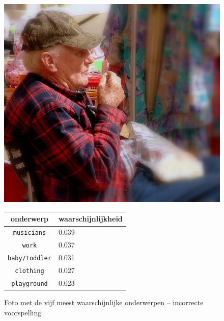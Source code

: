 \begin{figure}[h]
    \centering
    \begin{minipage}[t]{.5\linewidth}
    \centering
    \vspace{0pt}
    \includegraphics[width=\textwidth]{Images/LDA/3867804763.jpg}
    \end{minipage}\hfill
    \begin{minipage}[t]{.5\textwidth}
    \centering
    \vspace{0pt}
    \begin{tabular}{cl}
            onderwerp                           & waarschijnlijkheid\\
            \hline
            \texttt{musicians}             & 0.039 \\
            \texttt{work}                   & 0.037 \\
            \texttt{baby/toddler}                 & 0.031 \\
            \texttt{clothing}           & 0.027 \\
            \texttt{playground}        & 0.023\\
            \hline
        \end{tabular}
    \end{minipage}
    \caption{Foto met de vijf meest waarschijnlijke onderwerpen -- incorrecte voorspelling}
    \label{fig:wrongldalearning}
\end{figure}


